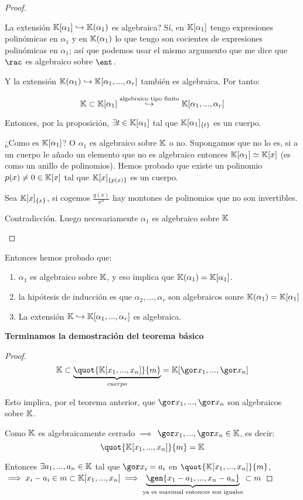 \begin{proof}
\begin{enumerate}
		La extensión $\mathbb{K}[\alpha_1] \hookrightarrow \mathbb{K}(\alpha_1)$ es algebraica? Sí, en $\mathbb{K}[\alpha_1]$ tengo expresiones polinómicas en $\alpha_1$ y en $\mathbb{K}(\alpha_1)$ lo que tengo son cocientes de expresiones polinómicas en $\alpha_1$;  así que podemos usar el mismo argumento que me dice que $\rac$ es algebraico sobre $\ent$.

		Y la extensión $\mathbb{K}(\alpha_1) \hookrightarrow \mathbb{K}[\alpha_1,...,\alpha_r]$ también es algebraica. Por tanto:

		$$ \mathbb{K} \subset \mathbb{K}[\alpha_1] \stackrel{\text{algebraico tipo finito}}{\hookrightarrow} \mathbb{K}[\alpha_1,...,\alpha_r]$$

		Entonces, por la proposición, $\exists t \in \mathbb{K}[\alpha_1]$ tal que $\mathbb{K}[\alpha_1]_{\{t\}}$ es un cuerpo.

		¿Como es $\mathbb{K}[\alpha_1]$? O $\alpha_1$ es algebraico sobre $\mathbb{K}$ o no. Supongamos que no lo es, si a un cuerpo le añado un elemento que no es algebraico entonces $\mathbb{K}[\alpha_1] \simeq \mathbb{K}[x]$ (es como un anillo de polinomios). Hemos probado que existe un polinomio $p(x)\neq 0 \in \mathbb{K}[x]$ tal que $\mathbb{K}[x]_{\{p(x)\}}$ es un cuerpo.

		\begin{example}
			Sea $\mathbb{K}[x]_{\{x\}}$, si cogemos $\frac{q(x)}{x^n}$ hay montones de polinomios que no son invertibles.
		\end{example}

		Contradicción. Luego necesariamente $\alpha_1$ es algebraico sobre $\mathbb{K}$
	\end{enumerate}
\end{proof}

Entonces hemos probado que:
\begin{enumerate}
	\item $\alpha_1$ es algebraico sobre $\mathbb{K}$, y eso implica que $\mathbb{K}(\alpha_1)=\mathbb{K}[\alpha_1]$.
	\item la hipótesis de inducción es que $\alpha_2,...,\alpha_r$ son algebraicos sonre $\mathbb{K}(\alpha_1)=\mathbb{K}[\alpha_1]$
	\item La extensión $ \mathbb{K}  \hookrightarrow \mathbb{K}[\alpha_1,...,\alpha_r]$ es algebraica.
\end{enumerate}



\textbf{Terminamos la demostración del teorema básico}
\begin{proof}
 $$ \K \subset \underbrace{\quot{\K[x_1,...,x_n]}{m}}_{cuerpo} = \K[\cls{x_1},...,\cls{x_n}]$$

 Esto implica, por el teorema anterior, que $\cls{x_1},...,\cls{x_n}$ son algebraicos sobre $\mathbb{K}$.

 Como $\mathbb{K}$ es algebraicamente cerrado $\implies$ $\cls{x_1},...,\cls{x_n} \in \K$, es decir:
 $$ \quot{\K[x_1,...,x_n]}{m}= \K $$

 Entonces $\exists a_1,...,a_n \in \mathbb{K}$ tal que $\cls{x_i}=a_i$ en $\quot{\K[x_1,...,x_n]}{m}$, $\implies x_i-a_i \in m\subset \K[x_1,...,x_n] \implies \underbrace{\gen{x_1-a_1,...,x_n-a_n}}_{\text{ya es maximal entonces son iguales}} \subset m$
\end{proof}

